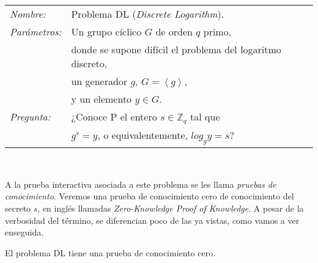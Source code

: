 \hfil

\begin{tabular}{|ll}
	\textit{Nombre:} & Problema DL (\textit{Discrete Logarithm}). \\
	\textit{Parámetros:} & Un grupo cíclico $G$ de orden $q$ primo, \\ & donde se supone difícil el problema del logaritmo discreto,  \\ & un generador $g$, $G=\left\langle g \right\rangle$,\\ & y un elemento $y\in G$. \\
	\textit{Pregunta:} & ¿Conoce P el entero $s\in \mathbb{Z}_q$ tal que \\ & $g^s = y$, o equivalentemente, $log_g y = s$? \\
\end{tabular}
\\

\hfil

A la prueba interactiva asociada a este problema se les llama \textit{pruebas de conocimiento}. Veremos una prueba de conocimiento  cero de conocimiento del secreto $s$, en inglés llamadas \textit{Zero-Knowledge Proof of Knowledge}. A pesar de la verbosidad del término, se diferencian poco de las ya vistas, como vamos a ver enseguida.


\begin{theorem}
	El problema DL tiene una prueba de conocimiento cero.
\end{theorem}


